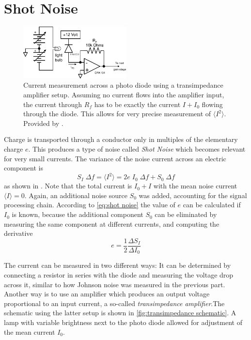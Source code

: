 \documentclass[
    parskip=half, 
    twoside=false,
    twocolumn=true,
    fontsize=11pt,
]{scrarticle}
\begin{document}
\section{Shot Noise}
\begin{figure}[h!]
    \centering
    \includegraphics[width=0.5\textwidth]{figures/tamp_schematic.pdf}
    \caption{
        Current measurement across a photo diode using a transimpedance amplifier setup. Assuming no current flows into the amplifier input, the current through $R_f$ has to be exactly the current $I + I_0$ flowing through the diode. This allows for very precise measurement of $\langle I^2 \rangle$.
        Provided by \autocite{instructions}.
    }
    \label{fig:transimpedance schematic}
\end{figure}
Charge is transported through a conductor only in multiples of the elementary charge $e$. This produces a type of noise called \textit{Shot Noise} which becomes relevant for very small currents. The variance of the noise current across an electric component is
\begin{equation}
    \label{eq:shot noise}
    S_I\;\Delta f = \langle I^2 \rangle = 2 e\; I_0\; \Delta f + S_0\;\Delta f
\end{equation}
as shown in \autocite{Buch}. Note that the total current is $I_0 + I$ with the mean noise current $\langle I \rangle = 0$. Again, an additional noise source $S_0$ was added, accounting for the signal processing chain. According to \autoref{eq:shot noise} the value of $e$ can be calculated if $I_0$ is known, because the additional component $S_0$ can be eliminated by measuring the same component at different currents, and computing the derivative
\begin{equation}
 e = \frac{1}{2}\frac{\Delta S_I}{\Delta I_0}
\end{equation}

The current can be measured in two different ways: 
It can be determined by connecting a resistor in series with the diode and measuring the voltage drop across it, similar to how Johnson noise was measured in the previous part. 
Another way is to use an amplifier which produces an output voltage proportional to an input current, a so-called \textit{transimpedance amplifier}.The schematic using the latter setup is shown in \autoref{fig:transimpedance schematic}. A lamp with variable brightness next to the photo diode allowed for adjustment of the mean current $I_0$.
\end{document}
